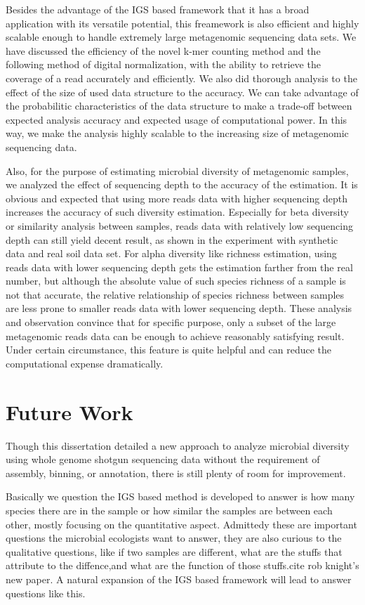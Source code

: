 Besides the advantage of the IGS based framework that it has a broad
application with its versatile potential, this freamework is also efficient and
highly scalable enough to handle extremely large metagenomic sequencing data
sets. We have discussed the efficiency of the novel k-mer counting method and
the following method of digital normalization, with the ability to retrieve the
coverage of a read accurately and efficiently. We also did thorough analysis
to the effect of the size of used data structure to the accuracy. We can take
advantage of the probabilitic characteristics of the data structure to make a
trade-off between expected analysis accuracy and expected usage of
computational power. In this way, we make the analysis highly scalable to
the increasing size of metagenomic sequencing data.  

Also, for the purpose of estimating microbial diversity of metagenomic samples,
we analyzed the effect of sequencing depth to the accuracy of the estimation.
It is obvious and expected that using more reads data with higher sequencing
depth increases the accuracy of such diversity estimation. Especially for beta
diversity or similarity analysis between samples, reads data with relatively
low sequencing depth can still yield decent result, as shown in the experiment
with synthetic data and real soil data set. For alpha diversity like richness
estimation, using reads data with lower sequencing depth gets the estimation
farther from the real number, but although the absolute value of such species
richness of a sample is not that accurate, the relative relationship of species
richness between samples are less prone to smaller reads data with lower
sequencing depth. These analysis and observation convince that for specific
purpose, only a subset of the large metagenomic reads data can be enough to
achieve reasonably satisfying result. Under certain circumstance, this feature
is quite helpful and can reduce the computational expense dramatically. 


\section{Future Work}


Though this dissertation detailed a new approach to analyze microbial diversity
using whole genome shotgun sequencing data without the requirement of assembly,
binning, or annotation, there is still plenty of room for improvement.  

Basically we question the IGS based method is developed to answer is how many
species there are in the sample or how similar the samples are between each
other, mostly focusing on the quantitative aspect. Admittedy these are 
important questions the microbial ecologists want to answer, they are also
curious to the qualitative questions, like if two samples are different, what
are the stuffs that attribute to the diffence,and what are the function of
those stuffs.cite rob knight's new paper.  A natural expansion of the IGS based framework will lead to
answer questions like this. 

